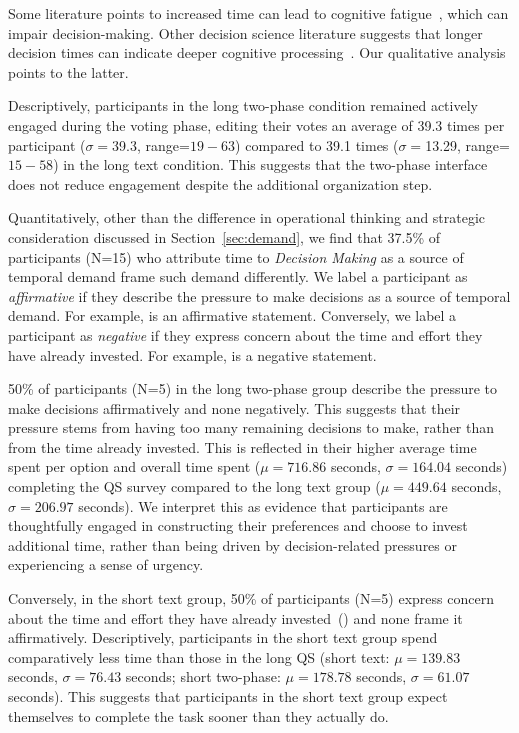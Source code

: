 Some literature points to increased time can lead to cognitive fatigue~\cite{kundingerReliableGroundTruth2020, karim2024examining}, which can impair decision-making. Other decision science literature suggests that longer decision times can indicate deeper cognitive processing~\cite{payneAdaptiveDecisionMaker1993, daniel2017thinking}. Our qualitative analysis points to the latter.

Descriptively, participants in the long two-phase condition remained actively engaged during the voting phase, editing their votes an average of 39.3 times per participant ($\sigma=$39.3, range=$19-63$) compared to 39.1 times ($\sigma=$13.29, range=$15-58$) in the long text condition. This suggests that the two-phase interface does not reduce engagement despite the additional organization step.

Quantitatively, other than the difference in operational thinking and strategic consideration discussed in Section~\ref{sec:demand}, we find that 37.5\% of participants (N=15) who attribute time to \textit{Decision Making} as a source of temporal demand frame such demand differently. We label a participant as \textit{affirmative} if they describe the pressure to make decisions as a source of temporal demand. For example,  is an affirmative statement. Conversely, we label a participant as \textit{negative} if they express concern about the time and effort they have already invested. For example,  is a negative statement.

50\% of participants (N=5) in the long two-phase group describe the pressure to make decisions affirmatively and none negatively. This suggests that their pressure stems from having too many remaining decisions to make, rather than from the time already invested. This is reflected in their higher average time spent per option and overall time spent ($\mu=716.86$ seconds, $\sigma=164.04$ seconds) completing the QS survey compared to the long text group ($\mu=449.64$ seconds, $\sigma=206.97$ seconds). We interpret this as evidence that participants are thoughtfully engaged in constructing their preferences and choose to invest additional time, rather than being driven by decision-related pressures or experiencing a sense of urgency.

Conversely, in the short text group, 50\% of participants (N=5) express concern about the time and effort they have already invested~() and none frame it affirmatively. Descriptively, participants in the short text group spend comparatively less time than those in the long QS (short text: $\mu=139.83$ seconds, $\sigma=76.43$ seconds; short two-phase: $\mu=178.78$ seconds, $\sigma=61.07$ seconds). This suggests that participants in the short text group expect themselves to complete the task sooner than they actually do. 

